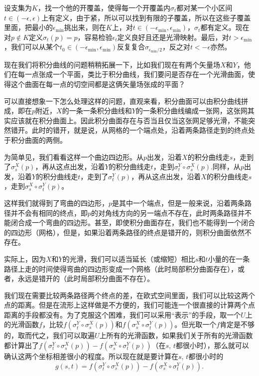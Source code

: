 设支集为$K$，找一个他的开覆盖，使得每一个开覆盖内$\sigma_t$都对某一个小区间$t\in (-\epsilon,\epsilon)$上有定义，由于紧，所以可以找到有限的子覆盖，所以在这些子覆盖里面，把最小的$\epsilon_{\text{min}}$挑出来，则在$K$上，对$t\in(-\epsilon_{\text{min}},\epsilon_{\text{min}})$，$\sigma_t$都有定义。现在对$p\notin K$定义$\sigma_t(p)=p$，容易检验$\epsilon_t$定义良好且还是光滑映射。最后，对$t>\epsilon_{\text{min}}$，我们可以从某个$t_0\in (-\epsilon_{\text{min}},\epsilon_{\text{min}})$反复复合$\sigma_{\epsilon_{\text{min}}/2}$，反之对$t<-\epsilon$亦然。

现在我们将积分曲线的问题稍稍拓展一下，比如我们现在有两个矢量场$X$和$Y$，他们在每一点张成一个平面，类比于积分曲线，我们要问是否存在一个光滑曲面，使得这个曲面在每一点的切空间都是这俩矢量场张成的平面？

可以直接想象一下怎么处理这样的问题，直观来看，积分曲面可以由积分曲线拼成，即在$p$附近，$X$的一条一条积分曲线和$Y$的一条积分曲线编成一张网，这张网其实应该就在积分曲面上。因此积分曲面存在与否当且仅当这张网足够光滑，不能突然错开。此时的错开，就是说，从网格的一个端点处，沿着两条路径走到的终点处于积分曲面的两侧。

为简单见，我们看看这样一个曲边四边形。从$p$出发，沿着$X$的积分曲线走$s$，走到了$\sigma^X_s(p)$，再从这点出发，沿着$Y$的积分曲线走$t$，走到$\sigma^Y_t\circ\sigma^X_s(p)$.同样，从$p$出发，沿着$Y$的积分曲线走$t$，走到了$\sigma^Y_t(p)$，再从这点出发，沿着$X$的积分曲线走$s$，走到$\sigma^X_s\circ\sigma^Y_t(p)$。

这样我们就得到了弯曲的四边形，$p$是其中一个端点，但是一般来说，沿着两条路径并不会有相同的终点，即$p$的对角线方向的另一端点不存在，此时两条路径并不能闭合成一个弯曲的四边形。甚至，即使积分曲面存在，我们也不能得到一个闭合的四边形（网格），但是，如果沿着两条路径的终点是错开的，则积分曲面依然不存在。

实际上，因为$X$和$Y$的光滑，我们可以适当延长（或缩短）相比$s$和$t$小量的在一条路径上走的时间使得弯曲的四边形变成一个网格（此时局部积分曲面存在），或者，永远是错开的（此时局部积分曲面不存在）。

我们现在需要比较两条路径两个终点的差，在欧式空间里面，我们可以比较这两个点的距离。但是在流形上这样做是不方便的，我们可能连一个很直接的计算两个点距离的手段都没有。为了克服这个困难，我们可以采用“表示”的手段，取一个$U$上的光滑函数$f$，比较$f(\sigma^Y_t\circ\sigma^X_s(p))$和$f(\sigma^X_s\circ\sigma^Y_t(p))$。但光取一个$f$肯定是不够的，取而代之，我们可以取遍$U$上所有的光滑函数，如果我们关于所有的光滑函数都计算出了$f(\sigma^Y_t\circ\sigma^X_s(p))-f(\sigma^X_s\circ\sigma^Y_t(p))$（在$s$, $t$都很小时），那么就可以确认这两个坐标相差很小的程度。所以现在就是要计算在$s$, $t$都很小时的
\[
	g(s,t)=f(\sigma^Y_t\circ\sigma^X_s(p))-f(\sigma^X_s\circ\sigma^Y_t(p)).
\]

